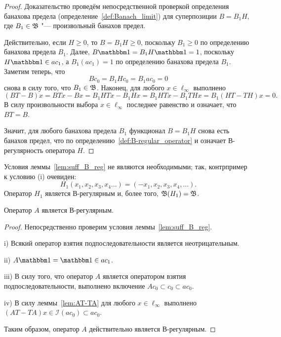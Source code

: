 \begin{proof}
	Доказательство проведём непосредственной проверкой определения банахова предела
	(определение~\ref{def:Banach_limit})
	для суперпозиции $B = B_1 H$,
	где $B_1 \in \mathfrak{B}$ "--- произвольный банахов предел.

	Действительно, если $H\geq 0$, то $B = B_1 H \geq 0$,
	поскольку $B_1 \geq 0$ по определению банахова предела $B_1$.
	Далее, $B\one = B_1 H \one = 1$, поскольку $H\one \in ac_1$,
	а $B_1(ac_1) = 1$ по определению банахова предела $B_1$.
	Заметим теперь, что
	\begin{equation}
		Bc_0 = B_1 H c_0 = B_1 ac_0 = 0
	\end{equation}
	снова в силу того, что $B_1\in\mathfrak{B}$.
	Наконец, для любого $x\in\ell_\infty$ выполнено
	\begin{equation}
		(BT-B)x = BTx - Bx = B_1 HTx - B_1 H x = B_1 HTx - B_1 T H x = B_1 (HT -  T H) x = 0
		.
	\end{equation}
	В силу произвольности выбора $x\in \ell_\infty$ последнее равенство и означает, что $BT=B$.

	Значит, для любого банахова предела $B_1$ функционал $B=B_1 H$ снова есть банахов предел,
	что по определению~\ref{def:B-regular_operator}
	и означает В-регулярность оператора $H$.
\end{proof}

\begin{remark}
	Условия леммы~\ref{lem:suff_B_reg} не являются необходимыми;
	так, контрпример к условию (i) очевиден:
	\begin{equation}
		H_1(x_1,x_2,x_3,x_4...) = (-x_1, x_2, x_3, x_4, ...)
		.
	\end{equation}
	Оператор $H_1$ является В-регулярным и, более того, $\mathfrak{B}(H_1) = \mathfrak{B}$.
\end{remark}


\begin{theorem}
	\label{thm:A_block_thrower_is_B-regular}
	Оператор $A$ является В-регулярным.
\end{theorem}

\begin{proof}
	Непосредственно проверим условия леммы~\ref{lem:suff_B_reg}.

	i) Всякий оператор взятия подпоследовательности является неотрицательным.

	ii) $A\one = \one \in ac_1$.

	iii)  В силу того, что оператор $A$ является оператором взятия подпоследовательности,
	выполнено включение $Ac_0 \subset c_0 \subset ac_0$.

	iv) В силу леммы~\ref{lem:AT-TA} для любого $x\in \ell_\infty$ выполнено $(AT-TA)x \in \mathcal{I}(ac_0) \subset ac_0$.

	Таким образом, оператор $A$ действительно является В-регулярным.
\end{proof}

